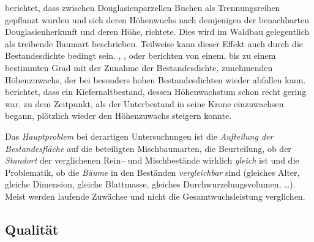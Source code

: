 \documentclass[twocolumn]{scrartcl}
\begin{document}
\citet[S.~259]{muench1928KlimarassenDerDouglasie} berichtet, dass
zwischen Douglasienparzellen Buchen als Trennungsreihen gepflanzt
wurden und sich deren Höhenwuchs nach demjenigen der benachbarten
Douglasienherkunft und deren Höhe, richtete. Dies wird im Waldbau
gelegentlich als treibende Baumart beschrieben. Teilweise kann dieser
Effekt auch durch die Bestandesdichte bedingt sein.
\cite{boehmerle1903BestandesdichteUndBestandeshoehe},
\cite{schmied1928UeberDenEinflussDerBestandesdichteAufDieBestandeshoeheInJuengerenBuchenbestaenden},
\citet[S.~75\,f.]{wiedemann1951Ertragskunde} oder
\citet[S.~46\,f.]{assmann1961Waldertraskunde} berichten von einem, bis
zu einem bestimmten Grad mit der Zunahme der Bestandesdichte,
zunehmenden Höhenzuwachs, der bei besonders hohen Bestandesdichten
wieder abfallen kann.
\cite{zundel1960ErtragskundlicheUntersuchungenInZweialtrigenBestaendenNordwuerttembergs}
berichtet, dass ein Kiefernaltbestand, dessen Höhenwachstum schon
recht gering war, zu dem Zeitpunkt, als der Unterbestand in seine
Krone einzuwachsen begann, plötzlich wieder den Höhenzuwachs steigern
konnte.

Das \emph{Hauptproblem} bei derartigen Untersuchungen ist die
\emph{Aufteilung der Bestandesfläche} auf die beteiligten
Mischbaumarten, die Beurteilung, ob der \emph{Standort} der
verglichenen Rein-- und Mischbestände wirklich \emph{gleich} ist und
die Problematik, ob die \emph{Bäume} in den Beständen
\emph{vergleichbar} sind (gleiches Alter, gleiche Dimension, gleiche
Blattmasse, gleiches Durchwurzelungsvolumen, \dots). Meist werden
laufende Zuwächse und nicht die Gesamtwuchsleistung verglichen.

\subsection{Qualität}
\label{ssec:qualitaet}
\end{document}
